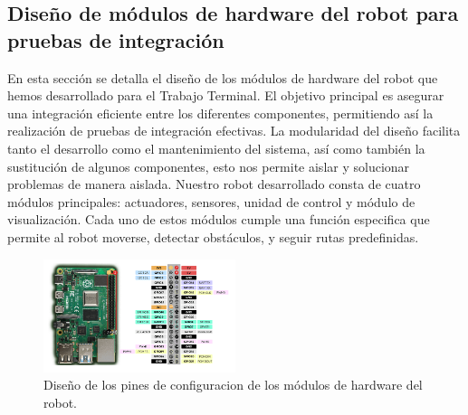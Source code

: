 \subsection{Diseño de módulos de hardware del robot para pruebas de integración}
    En esta sección se detalla el diseño de los módulos de hardware del robot que hemos
        desarrollado para el Trabajo Terminal. El objetivo principal es asegurar una integración
        eficiente entre los diferentes componentes, permitiendo así la realización de pruebas
        de integración efectivas. La modularidad del diseño facilita tanto el desarrollo como el
        mantenimiento del sistema, así como también la sustitución de algunos componentes,
        esto nos permite aislar y solucionar problemas de manera aislada.
    \vskip 0.5cm
    Nuestro robot desarrollado consta de cuatro módulos principales: actuadores,
        sensores, unidad de control y módulo de visualización. Cada uno de estos módulos
        cumple una función especifica que permite al robot moverse, detectar obstáculos, y
        seguir rutas predefinidas.
    \vskip 0.5cm
    \begin{figure}[htbp]
        \centering
        \includegraphics[width=0.5\textwidth]{./images/Pruebas/robot/robot01.png}
        \caption{Diseño de los pines de configuracion de los módulos de hardware del robot.}
        \label{fig:robot}
    \end{figure}

